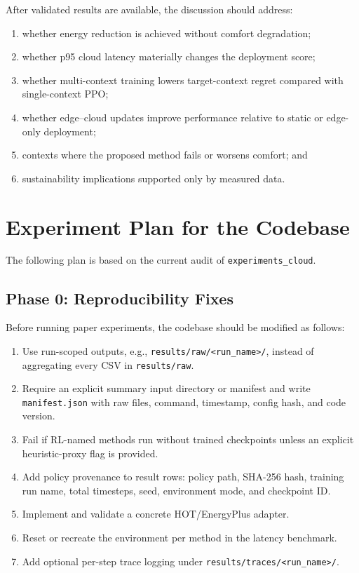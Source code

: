 \documentclass[11pt,a4paper]{article}
\begin{document}
After validated results are available, the discussion should address:
\begin{enumerate}
  \item whether energy reduction is achieved without comfort degradation;
  \item whether p95 cloud latency materially changes the deployment score;
  \item whether multi-context training lowers target-context regret compared with single-context PPO;
  \item whether edge--cloud updates improve performance relative to static or edge-only deployment;
  \item contexts where the proposed method fails or worsens comfort; and
  \item sustainability implications supported only by measured data.
\end{enumerate}

\section{Experiment Plan for the Codebase}

The following plan is based on the current audit of \texttt{experiments\_cloud}.

\subsection{Phase 0: Reproducibility Fixes}

Before running paper experiments, the codebase should be modified as follows:
\begin{enumerate}
  \item Use run-scoped outputs, e.g., \texttt{results/raw/<run\_name>/}, instead of aggregating every CSV in \texttt{results/raw}.
  \item Require an explicit summary input directory or manifest and write \texttt{manifest.json} with raw files, command, timestamp, config hash, and code version.
  \item Fail if RL-named methods run without trained checkpoints unless an explicit heuristic-proxy flag is provided.
  \item Add policy provenance to result rows: policy path, SHA-256 hash, training run name, total timesteps, seed, environment mode, and checkpoint ID.
  \item Implement and validate a concrete HOT/EnergyPlus adapter.
  \item Reset or recreate the environment per method in the latency benchmark.
  \item Add optional per-step trace logging under \texttt{results/traces/<run\_name>/}.
\end{enumerate}
\end{document}
